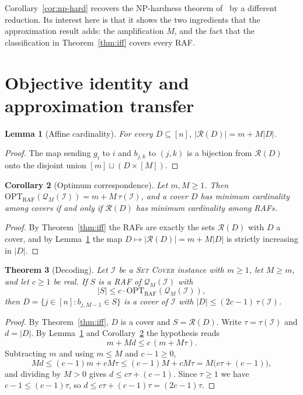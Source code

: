 \documentclass[11pt,a4paper]{article}
\theoremstyle{plain}
\newtheorem{theorem}{Theorem}[section]
\newtheorem{lemma}[theorem]{Lemma}
\newtheorem{corollary}[theorem]{Corollary}
\theoremstyle{definition}
\theoremstyle{remark}
\newcommand{\OPT}{\mathrm{OPT}}
\newcommand{\RAF}{\mathrm{RAF}}
\newcommand{\optraf}{\OPT_{\RAF}}
\newcommand{\cQ}{\mathcal{Q}}
\newcommand{\cR}{\mathcal{R}}
\newcommand{\cI}{\mathcal{I}}
\newcommand{\tauI}{\tau(\cI)}
\newcommand{\SetCover}{\textup{\textsc{Set Cover}}}
\begin{document}
Corollary~\ref{cor:np-hard} recovers the NP-hardness theorem of~\cite{steel2013minimal} by a different reduction. Its interest here is that it shows the two ingredients that the approximation result adds: the amplification $M$, and the fact that the classification in Theorem~\ref{thm:iff} covers every RAF.

\section{Objective identity and approximation transfer}\label{sec:transfer}

\begin{lemma}[Affine cardinality]\label{lem:card}
For every $D\subseteq[n]$, $|\cR(D)|=m+M|D|$.
\end{lemma}

\begin{proof}
The map sending $g_i$ to $i$ and $b_{j,k}$ to $(j,k)$ is a bijection from $\cR(D)$ onto the disjoint union $[m]\sqcup(D\times[M])$.
\end{proof}

\begin{corollary}[Optimum correspondence]\label{cor:opt}
Let $m,M\ge 1$. Then $\optraf(\cQ_M(\cI))=m+M\,\tauI$, and a cover $D$ has minimum cardinality among covers if and only if $\cR(D)$ has minimum cardinality among RAFs.
\end{corollary}

\begin{proof}
By Theorem~\ref{thm:iff} the RAFs are exactly the sets $\cR(D)$ with $D$ a cover, and by Lemma~\ref{lem:card} the map $D\mapsto|\cR(D)|=m+M|D|$ is strictly increasing in $|D|$.
\end{proof}

\begin{theorem}[Decoding]\label{thm:decode}
Let $\cI$ be a \SetCover{} instance with $m\ge 1$, let $M\ge m$, and let $c\ge 1$ be real. If $S$ is a RAF of $\cQ_M(\cI)$ with
\[
|S|\le c\cdot\optraf(\cQ_M(\cI)),
\]
then $D=\{j\in[n]:b_{j,M-1}\in S\}$ is a cover of $\cI$ with $|D|\le(2c-1)\,\tauI$.
\end{theorem}

\begin{proof}
By Theorem~\ref{thm:iff}, $D$ is a cover and $S=\cR(D)$. Write $\tau=\tauI$ and $d=|D|$. By Lemma~\ref{lem:card} and Corollary~\ref{cor:opt} the hypothesis reads
\[
m+Md\le c\,(m+M\tau).
\]
Subtracting $m$ and using $m\le M$ and $c-1\ge 0$,
\[
Md\le (c-1)m+cM\tau\le (c-1)M+cM\tau=M\bigl(c\tau+(c-1)\bigr),
\]
and dividing by $M>0$ gives $d\le c\tau+(c-1)$. Since $\tau\ge 1$ we have $c-1\le(c-1)\tau$, so $d\le c\tau+(c-1)\tau=(2c-1)\tau$.
\end{proof}
\end{document}
